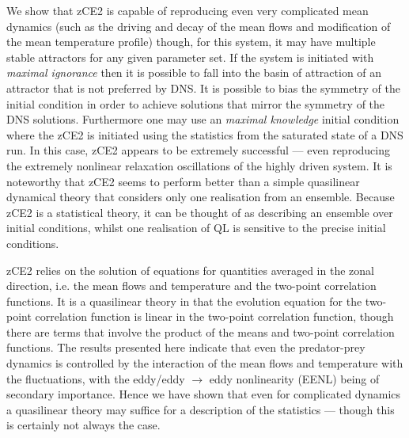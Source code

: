 \documentclass{jfm}
\begin{document}
We show that zCE2 is capable of reproducing even very complicated mean dynamics (such as the driving and decay of the mean flows and modification of the mean temperature profile) though, for this system, it may have multiple stable attractors for any given parameter set. If the system is initiated with \textit{maximal ignorance} then it is possible to fall into the basin of attraction of an attractor that is not preferred by DNS. It is possible to bias the symmetry of the initial condition in order to achieve solutions that mirror the symmetry of the DNS solutions. Furthermore one may use an \textit{maximal knowledge} initial condition where the zCE2 is initiated using the statistics from the saturated state of a DNS run. In this case, zCE2 appears to be extremely successful --- even reproducing the extremely nonlinear relaxation oscillations of the highly driven system. It is noteworthy that zCE2 seems to perform better than a simple quasilinear dynamical theory that considers only one realisation from an ensemble. Because zCE2 is a statistical theory, it can be thought of as describing an ensemble over initial conditions, whilst one realisation of QL is sensitive to the precise initial conditions.

zCE2 relies on the solution of equations for quantities averaged in the zonal direction, i.e. the mean flows and temperature and the two-point correlation functions.  It is a quasilinear theory in that the evolution equation for the two-point correlation function 
is linear in the two-point correlation function, though there are terms that involve the product of the means and two-point correlation functions. The results presented here indicate that even the predator-prey dynamics is controlled by the interaction of the mean flows and temperature with the fluctuations, with the eddy/eddy $\rightarrow$ eddy nonlinearity (EENL) being of secondary importance. Hence we have shown that even for complicated dynamics a quasilinear theory may suffice for a description of the statistics --- though this is certainly not always the case.
\end{document}
